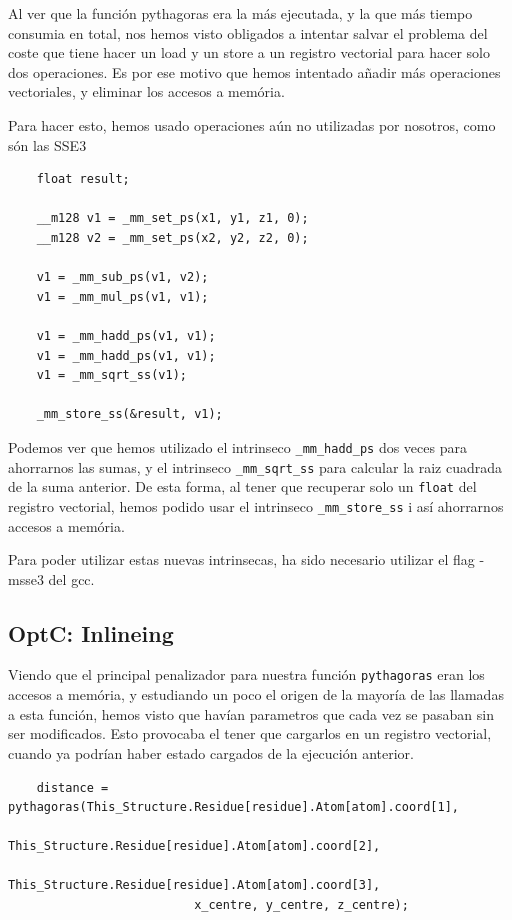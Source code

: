 Al ver que la funci\'{o}n pythagoras era la m\'{a}s ejecutada, y la que
m\'{a}s tiempo consumia en total, nos hemos visto obligados a intentar
salvar el problema del coste que tiene hacer un load y un store a un
registro vectorial para hacer solo dos operaciones. Es por ese motivo que
hemos intentado a\~{n}adir m\'{a}s operaciones vectoriales, y eliminar los
accesos a mem\'{o}ria.

Para hacer esto, hemos usado operaciones a\'{u}n no utilizadas por nosotros,
como s\'{o}n las SSE3

\begin{lstlisting}
	float result;
	
	__m128 v1 = _mm_set_ps(x1, y1, z1, 0);
	__m128 v2 = _mm_set_ps(x2, y2, z2, 0);
	
	v1 = _mm_sub_ps(v1, v2);
	v1 = _mm_mul_ps(v1, v1);

	v1 = _mm_hadd_ps(v1, v1);
	v1 = _mm_hadd_ps(v1, v1);
	v1 = _mm_sqrt_ss(v1);	
	
	_mm_store_ss(&result, v1);
\end{lstlisting}

Podemos ver que hemos utilizado el intrinseco \texttt{\_mm\_hadd\_ps} dos
veces para ahorrarnos las sumas, y el intrinseco \texttt{\_mm\_sqrt\_ss} para
calcular la raiz cuadrada de la suma anterior. De esta forma, al tener que
recuperar solo un \texttt{float} del registro vectorial, hemos podido usar
el intrinseco \texttt{\_mm\_store\_ss} i as\'{i} ahorrarnos accesos a
mem\'{o}ria.

Para poder utilizar estas nuevas intrinsecas, ha sido necesario utilizar el
flag -msse3 del gcc.

\subsection{OptC: Inlineing}

Viendo que el principal penalizador para nuestra funci\'{o}n
\texttt{pythagoras} eran los accesos a mem\'{o}ria, y estudiando un poco el
origen de la mayor\'{i}a de las llamadas a esta funci\'{o}n, hemos visto
que hav\'{i}an parametros que cada vez se pasaban sin ser modificados. Esto
provocaba el tener que cargarlos en un registro vectorial, cuando ya
podr\'{i}an haber estado cargados de la ejecuci\'{o}n anterior.

\begin{lstlisting}
	distance = pythagoras(This_Structure.Residue[residue].Atom[atom].coord[1], 
						  This_Structure.Residue[residue].Atom[atom].coord[2], 
						  This_Structure.Residue[residue].Atom[atom].coord[3],
						  x_centre, y_centre, z_centre);
\end{lstlisting}
 
